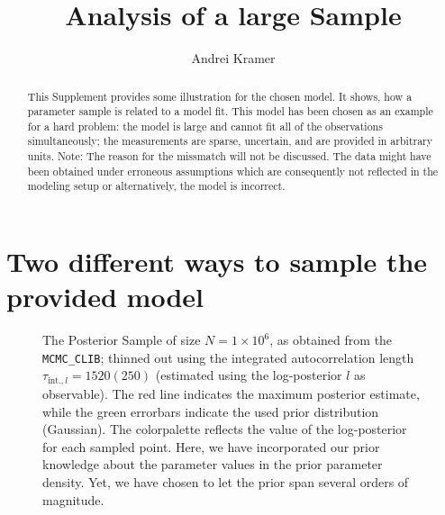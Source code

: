 \documentclass[english]{scrartcl}
\author{Andrei Kramer}
\title{Analysis of a large Sample}
\begin{document}
\maketitle
\begin{abstract}
  This Supplement provides some illustration for the chosen model. It
  shows, how a parameter sample is related to a model fit. This model
  has been chosen as an example for a hard problem: the model is large
  and cannot fit all of the observations simultaneously; the
  measurements are sparse, uncertain, and are provided in arbitrary
  units. Note: The reason for the missmatch will not be discussed. The
  data might have been obtained under erroneous assumptions which are
  consequently not reflected in the modeling setup or alternatively,
  the model is incorrect.
\end{abstract}
\section{Two different ways to sample the provided model}

\begin{figure}
  \hspace*{-1cm}
  
  \caption{The Posterior Sample of size $N=1\times10^6$, as obtained
    from the \texttt{MCMC\_CLIB}; thinned out using the integrated
    autocorrelation length $\tau_{\text{int.},l}=1520(250)$ (estimated
    using the log-posterior $l$ as observable). The red line indicates
    the maximum posterior estimate, while the green errorbars indicate
    the used prior distribution (Gaussian). The colorpalette reflects
    the value of the log-posterior for each sampled point.  Here, we
    have incorporated our prior knowledge about the parameter values
    in the prior parameter density. Yet, we have chosen to let the
    prior span several orders of magnitude.\label{fig:pc-sample}}
\end{figure}
\end{document}
